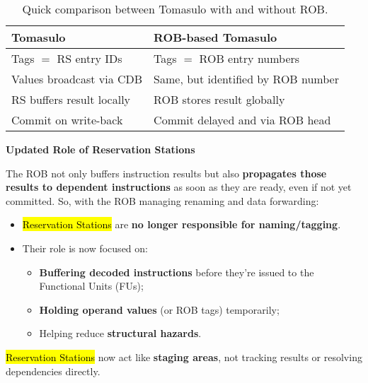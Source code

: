 \begin{table}[!htp]
    \centering
    \begin{tabular}{@{} l | l @{}}
        \toprule
        Tomasulo & ROB-based Tomasulo \\
        \midrule
        Tags $=$ RS entry IDs       & Tags $=$ ROB entry numbers            \\ [.3em]
        Values broadcast via CDB    & Same, but identified by ROB number    \\ [.3em]
        RS buffers result locally   & ROB stores result globally            \\ [.3em]
        Commit on write-back        & Commit delayed and via ROB head       \\
        \bottomrule
    \end{tabular}
    \caption{Quick comparison between Tomasulo with and without ROB.}
\end{table}

\highspace
\begin{flushleft}
    \textcolor{Green3}{ \textbf{Updated Role of Reservation Stations}}
\end{flushleft}
The ROB not only buffers instruction results but also \textbf{propagates those results to dependent instructions} as soon as they are ready, even if not yet committed. So, with the ROB managing renaming and data forwarding:
\begin{itemize}
    \item[\textcolor{Red2}{\faIcon{times}}] \hl{Reservation Stations} are \textbf{no longer responsible for naming/tagging}.
    \item[\textcolor{Green3}{\faIcon{check}}] Their role is now focused on:
    \begin{itemize}
        \item \textbf{Buffering decoded instructions} before they're issued to the Functional Units (FUs);
        \item \textbf{Holding operand values} (or ROB tags) temporarily;
        \item Helping reduce \textbf{structural hazards}.
    \end{itemize}
\end{itemize}
\hl{Reservation Stations} now act like \textbf{staging areas}, not tracking results or resolving dependencies directly.


